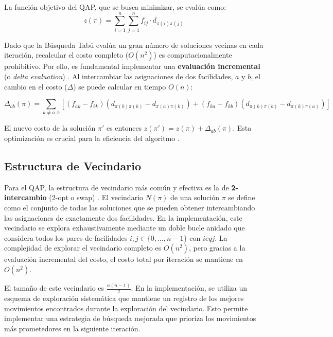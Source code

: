 \documentclass[12pt, a4paper]{article}
\begin{document}
La función objetivo del QAP, que se busca minimizar, se evalúa como:
\begin{equation}
z(\pi) = \sum_{i=1}^{n} \sum_{j=1}^{n} f_{ij} \cdot d_{\pi(i)\pi(j)}
\end{equation}

Dado que la Búsqueda Tabú evalúa un gran número de soluciones vecinas en cada iteración, recalcular el costo completo ($O(n^2)$) es computacionalmente prohibitivo. Por ello, es fundamental implementar una \textbf{evaluación incremental} (o \textit{delta evaluation}) \cite{taillard1991}. Al intercambiar las asignaciones de dos facilidades, $a$ y $b$, el cambio en el costo ($\Delta$) se puede calcular en tiempo $O(n)$:

\begin{equation}
\Delta_{ab}(\pi) = \sum_{k \neq a,b} \left[ (f_{ak} - f_{bk})(d_{\pi(b)\pi(k)} - d_{\pi(a)\pi(k)}) + (f_{ka} - f_{kb})(d_{\pi(k)\pi(b)} - d_{\pi(k)\pi(a)}) \right]
\label{eq:delta}
\end{equation}

El nuevo costo de la solución $\pi'$ es entonces $z(\pi') = z(\pi) + \Delta_{ab}(\pi)$. Esta optimización es crucial para la eficiencia del algoritmo \cite{burkard1984}.

\subsection{Estructura de Vecindario}

Para el QAP, la estructura de vecindario más común y efectiva es la de \textbf{2-intercambio} (2-opt o swap) \cite{burkard1998}. El vecindario $N(\pi)$ de una solución $\pi$ se define como el conjunto de todas las soluciones que se pueden obtener intercambiando las asignaciones de exactamente dos facilidades. En la implementación, este vecindario se explora exhaustivamente mediante un doble bucle anidado que considera todos los pares de facilidades $i,j \in \{0,\dots,n-1\}$ con $i 
eq j$. La complejidad de explorar el vecindario completo es $O(n^2)$, pero gracias a la evaluación incremental del costo, el costo total por iteración se mantiene en $O(n^2)$.

El tamaño de este vecindario es $\frac{n(n-1)}{2}$. En la implementación, se utiliza un esquema de exploración sistemática que mantiene un registro de los mejores movimientos encontrados durante la exploración del vecindario. Esto permite implementar una estrategia de búsqueda mejorada que prioriza los movimientos más prometedores en la siguiente iteración.
\end{document}
